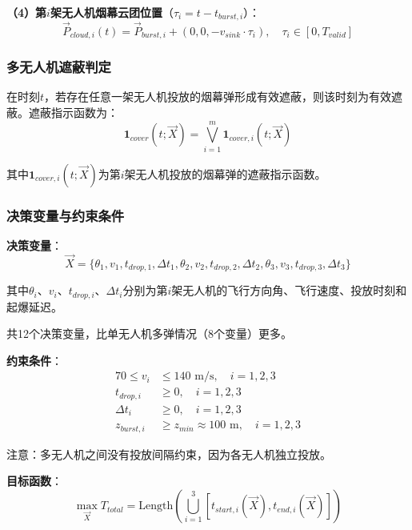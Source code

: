 \documentclass[12pt,a4paper]{article}
\begin{document}
\noindent\textbf{（4）第$i$架无人机烟幕云团位置}（$\tau_i = t - t_{burst,i}$）：
\begin{equation}
\vec{P}_{cloud,i}(t) = \vec{P}_{burst,i} + (0, 0, -v_{sink} \cdot \tau_i), \quad \tau_i \in [0, T_{valid}]
\end{equation}

\subsubsection{多无人机遮蔽判定}

\indent 在时刻$t$，若存在任意一架无人机投放的烟幕弹形成有效遮蔽，则该时刻为有效遮蔽。遮蔽指示函数为：
\begin{equation}
\mathbf{1}_{cover}(t; \vec{X}) = \bigvee_{i=1}^{m} \mathbf{1}_{cover,i}(t; \vec{X})
\end{equation}

\indent 其中$\mathbf{1}_{cover,i}(t; \vec{X})$为第$i$架无人机投放的烟幕弹的遮蔽指示函数。

\subsubsection{决策变量与约束条件}

\noindent\textbf{决策变量}：
\begin{equation}
\vec{X} = \{\theta_1, v_1, t_{drop,1}, \Delta t_1, \theta_2, v_2, t_{drop,2}, \Delta t_2, \theta_3, v_3, t_{drop,3}, \Delta t_3\}
\end{equation}

\indent 其中$\theta_i$、$v_i$、$t_{drop,i}$、$\Delta t_i$分别为第$i$架无人机的飞行方向角、飞行速度、投放时刻和起爆延迟。

\indent 共12个决策变量，比单无人机多弹情况（8个变量）更多。

\noindent\textbf{约束条件}：
\begin{align}
70 \leq v_i &\leq 140 \text{ m/s}, \quad i = 1, 2, 3 \\
t_{drop,i} &\geq 0, \quad i = 1, 2, 3 \\
\Delta t_i &\geq 0, \quad i = 1, 2, 3 \\
z_{burst,i} &\geq z_{min} \approx 100 \text{ m}, \quad i = 1, 2, 3
\end{align}

\indent 注意：多无人机之间没有投放间隔约束，因为各无人机独立投放。

\noindent\textbf{目标函数}：
\begin{equation}
\max_{\vec{X}} T_{total} = \text{Length}\left(\bigcup_{i=1}^{3} [t_{start,i}(\vec{X}), t_{end,i}(\vec{X})]\right)
\end{equation}
\end{document}
